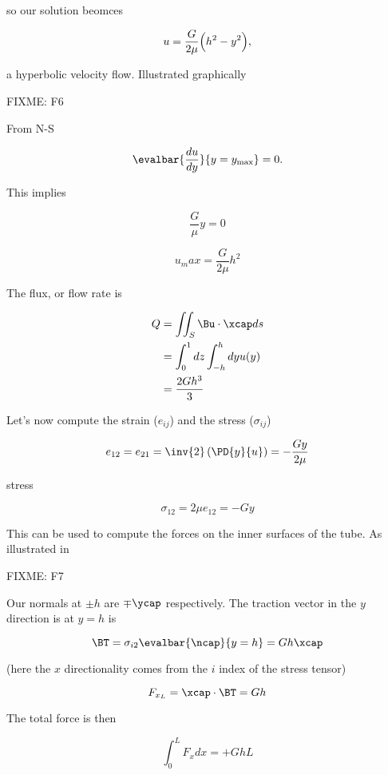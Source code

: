 so our solution beomces

\begin{equation}\label{eqn:continuumL11:690}
u = \frac{G}{2 \mu} \Bigl( h^2 - y^2 \Bigr),
\end{equation}

a hyperbolic velocity flow.  Illustrated graphically

FIXME: F6

From N-S

\begin{equation}\label{eqn:continuumL11:710}
\evalbar{\frac{du}{dy}}{y = y_{\text{max}}} = 0.
\end{equation}

This implies

\begin{equation}\label{eqn:continuumL11:n}
\frac{G}{\mu} y = 0
\end{equation}

\begin{equation}\label{eqn:continuumL11:n}
u_max = \frac{G}{2\mu} h^2
\end{equation}

The flux, or flow rate is

\begin{align*}
Q 
&= \iint_S \Bu \cdot \xcap ds \\
&= \int_0^1 dz \int_{-h}^h dy u(y) \\
&=
\frac{2 G h^3}{3}
\end{align*}

Let's now compute the strain ($e_{ij}$) and the stress ($\sigma_{ij}$)

\begin{equation}\label{eqn:continuumL11:730}
e_{12} = e_{21} = \inv{2} \left( \PD{y}{u} \right) = - \frac{G y}{2 \mu}
\end{equation}

stress

\begin{equation}\label{eqn:continuumL11:750}
\sigma_{12} = 2 \mu e_{12} = -G y
\end{equation}

This can be used to compute the forces on the inner surfaces of the tube.  As illustrated in

FIXME: F7

Our normals at $\pm h$ are $\mp \ycap$ respectively.  The traction vector in the $y$ direction is at $y = h$ is

\begin{equation}\label{eqn:continuumL11:770}
\BT = \sigma_{i 2} \evalbar{\ncap}{y = h} = G h \xcap
\end{equation}

(here the $x$ directionality comes from the $i$ index of the stress tensor)

\begin{equation}\label{eqn:continuumL11:790}
F_{x_L} = \xcap \cdot \BT = G h
\end{equation}

The total force is then

\begin{equation}\label{eqn:continuumL11:810}
\int_0^L F_x dx = + G h L
\end{equation}

\EndArticle
